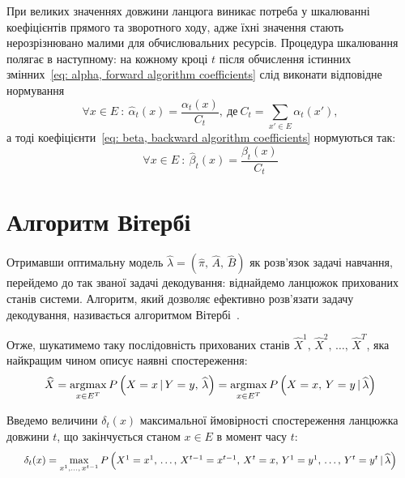 \newpage
\begin{remark}
    При великих значеннях довжини ланцюга виникає потреба у шкалюванні~\cite[розділ 5]{Nilsson2005} коефіцієнтів прямого та зворотного ходу, адже їхні значення стають нерозрізнювано малими для обчислювальних ресурсів. Процедура шкалювання полягає в наступному: на кожному кроці $t$ після обчислення істинних змінних~\eqref{eq: alpha, forward algorithm coefficients} слід виконати відповідне нормування
    \begin{equation*}
        \forall x \in E\ :\ \widehat{\alpha}_t(x) = \frac{\alpha_t(x)}{C_t},\ \text{де}\ C_t = \sum\limits_{x' \in E}\alpha_t(x'),
    \end{equation*}
    а тоді коефіцієнти~\eqref{eq: beta, backward algorithm coefficients} нормуються так:
    \begin{equation*}
        \forall x \in E\ :\ \widehat{\beta}_t(x) = \frac{\beta_t(x)}{C_t}
    \end{equation*}
\end{remark}

\section{Алгоритм Вітербі}
\label{section: Viterbi alorithm}

Отримавши оптимальну модель $\widehat{\lambda}=(\widehat{\pi},\,\widehat{A},\,\widehat{B})$ як розв'язок задачі навчання, перейдемо до так званої задачі декодування: віднайдемо ланцюжок прихованих станів системи. Алгоритм, який дозволяє ефективно розв’язати задачу декодування, називається алгоритмом Вітербі~\cite[розділ 6]{Nilsson2005}.

Отже, шукатимемо таку послідовність прихованих станів $\widehat{X}^1,\,\widehat{X}^2,\,\ldots,\,\widehat{X}^T$, яка найкращим чином описує наявні спостереження:
\begin{equation*}
    \widehat{X} = \operatorname*{argmax}\limits_{x \in E^T} P\left( X=x \,|\, Y=y,\, \widehat{\lambda} \right) = \operatorname*{argmax}\limits_{x \in E^T} P\left( X=x,\, Y=y \,|\, \widehat{\lambda} \right)
\end{equation*}

Введемо величини $\delta_t(x)$ максимальної ймовірності спостереження ланцюжка довжини $t$, що закінчується станом $x \in E$ в момент часу $t:$
\begin{equation*}\scaleq[0.9]{
    \delta_t(x)=\max\limits_{x^1,\ldots,\,x^{t-1}}P\left( X^1=x^1,\,\ldots,\,X^{t-1}=x^{t-1},\,X^t=x,\,Y^1=y^1,\,\ldots,\,Y^t=y^t \,|\, \widehat{\lambda}  \right)}
\end{equation*}

